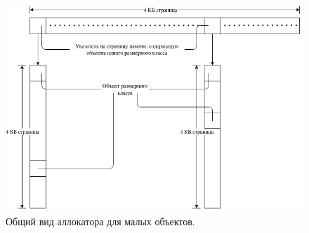 \begin{figure}[!h]
	\begin{center}
		\includegraphics[scale=0.6]{images/small-allocator-design.png}
		\caption{Общий вид аллокатора для малых объектов.}
		\label{small-allocator-design}
	\end{center}
\end{figure}

